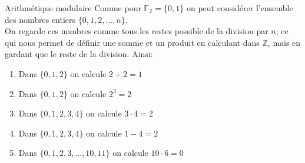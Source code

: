 

\begin{parag}{Arithmétique modulaire}
    Comme pour $\mathbb{F_2} = \{0, 1\}$ on peut considérer l'ensemble des nombres entiers $\{0, 1, 2, \dots, n\}$.
    \\
    On regarde ces nombres comme tous les restes possible de la division par $n$, ce qui nous permet de définir une somme et un produit en calculant dans $\mathbb{Z}$, mais en gardant que le reste de la division. Ainsi:
    \begin{enumerate}
        \item Dans $\{0, 1, 2\}$ on calcule $2 + 2 = 1$
        \item Dans $\{0, 1, 2\}$ on calcule $2^3 =2 $
        \item Dans $\{0, 1, 2, 3, 4\}$ on calcule $3 \cdot 4 = 2$
        \item Dans $\{0, 1, 2, 3, 4\}$ on calcule $1 - 4 = 2 $
        \item Dans $\{0, 1, 2, 3, \dots, 10, 11\}$ on calcule $10 \cdot 6 = 0 $
    \end{enumerate}
\end{parag}

